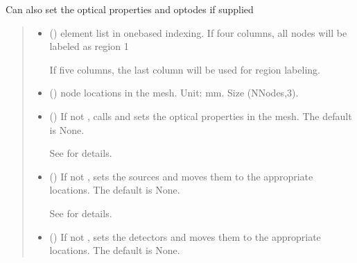 \documentclass[letterpaper,10pt,english]{sphinxmanual}
\begin{document}
\begin{fulllineitems}
\begin{fulllineitems}
\sphinxAtStartPar
Can also set the optical properties and optodes if supplied
\begin{quote}\begin{description}
\begin{itemize}
\item {} 
\sphinxAtStartPar
{} () \textendash{} 
\sphinxAtStartPar
element list in one\sphinxhyphen{}based indexing. If four columns, all nodes will be labeled as region 1

\sphinxAtStartPar
If five columns, the last column will be used for region labeling.


\item {} 
\sphinxAtStartPar
{} () \textendash{} node locations in the mesh. Unit: mm. Size (NNodes,3).

\item {} 
\sphinxAtStartPar
{} (\sphinxstyleliteralemphasis{\sphinxupquote{, }}) \textendash{} 
\sphinxAtStartPar
If not , calls  and sets the optical properties in the mesh. The default is None.

\sphinxAtStartPar
See {\hyperref[\detokenize{_autosummary/nirfasterff.base.dcs_mesh.dcsmesh:nirfasterff.base.dcs_mesh.dcsmesh.set_prop}]{}} for details.


\item {} 
\sphinxAtStartPar
{} (\sphinxstyleliteralemphasis{\sphinxupquote{, }}) \textendash{} 
\sphinxAtStartPar
If not , sets the sources and moves them to the appropriate locations. The default is None.

\sphinxAtStartPar
See {\hyperref[\detokenize{_autosummary/nirfasterff.base.optodes.optode:nirfasterff.base.optodes.optode.touch_sources}]{}} for details.


\item {} 
\sphinxAtStartPar
{} (\sphinxstyleliteralemphasis{\sphinxupquote{, }}) \textendash{} 
\sphinxAtStartPar
If not , sets the detectors and moves them to the appropriate locations. The default is None.


\end{itemize}
\end{description}
\end{quote}
\end{fulllineitems}
\end{fulllineitems}
\end{document}
